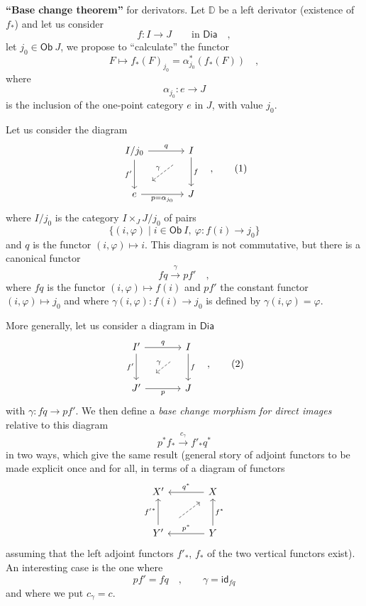 \documentclass[11pt]{article}
\newcommand{\printedpage}[1]{\marginpar{\footnotesize p.~#1}}
\newcommand{\msp}[1]{\marginpar{\footnotesize [#1]}}
\newcommand{\sDia}{\mathsf{Dia}}
\newcommand{\sOb}{\mathsf{Ob}}
\newcommand{\sid}{\mathsf{id}}
\newcommand{\DD}{\mathbb{D}}
\begin{document}
\textbf{``Base change theorem''} for derivators. Let $\DD$ be a left derivator (existence of $f_*$) and let us consider
\[ f : I \longrightarrow J \qquad \text{in } \sDia \quad , \]
let $j_0 \in \sOb\ J$, we propose to ``calculate'' the functor
\[ F \mapsto f_*(F)_{j_0} = \alpha^*_{j_0}(f_*(F)) \quad , \]
where
\[ \alpha_{j_0} : e \longrightarrow J \]
is the inclusion of the one-point category $e$ in $J$, with value $j_0$.

\msp{page 30}
Let us consider the diagram
\[
\begin{tikzcd}[row sep=large, column sep=large]
I/j_0 \arrow[r, "q"] \arrow[d, "f'"'] & I \arrow[d, "f"] \\
e \arrow[r, "p = \alpha_{j_0}"'] & J
\arrow[from=1-2, to=2-1, dashed, shorten <=14pt, shorten >=14pt, "\gamma"']
\end{tikzcd}
\quad ,
\tag*{(1)}
\]
where $I/j_0$ is the category $I \times_J J/j_0$ of pairs
\[ \{(i,\varphi) \mid i \in \sOb\ I,\ \varphi : f(i) \to j_0\} \]
and $q$ is the functor $(i,\varphi) \mapsto i$. This diagram is not commutative, but there is a canonical functor
\[ fq \xrightarrow{\gamma} pf' \quad , \]
where $fq$ is the functor $(i,\varphi) \mapsto f(i)$ and $pf'$ the constant functor $(i,\varphi) \mapsto j_0$ and where $\gamma(i,\varphi) : f(i) \to j_0$ is defined by $\gamma(i,\varphi) = \varphi$.

More generally, let us consider a diagram in $\sDia$
\[
\begin{tikzcd}[row sep=large, column sep=large]
I' \arrow[r, "q"] \arrow[d, "f'"'] & I \arrow[d, "f"] \\
J' \arrow[r, "p"'] & J
\arrow[from=1-2, to=2-1, dashed, shorten <=14pt, shorten >=14pt, "\gamma"']
\end{tikzcd}
\quad ,
\tag*{(2)}
\]
\printedpage{21}
with $\gamma : fq \to pf'$. We then define a \textit{base change morphism for direct images} relative to this diagram
\[ p^* f_* \xrightarrow{c_\gamma} f'_* q^* \]
\msp{page 31}
in two ways, which give the same result (general story of adjoint functors to be made explicit once and for all, in terms of a diagram of functors
\[
\begin{tikzcd}[row sep=large, column sep=large]
X' & X \arrow[l, "q^*"'] \\
Y' \arrow[u, "{f'}^*"] & Y \arrow[l, "p^*"'] \arrow[u, "f^*"']
\arrow[from=2-1, to=1-2, dashed, shorten <=14pt, shorten >=6pt]
\end{tikzcd}
\]
assuming that the left adjoint functors $f'_*$, $f_*$ of the two vertical functors exist). An interesting case is the one where
\[ pf' = fq \quad , \qquad \gamma = \sid_{fq} \]
and where we put $c_\gamma = c$.
\end{document}
